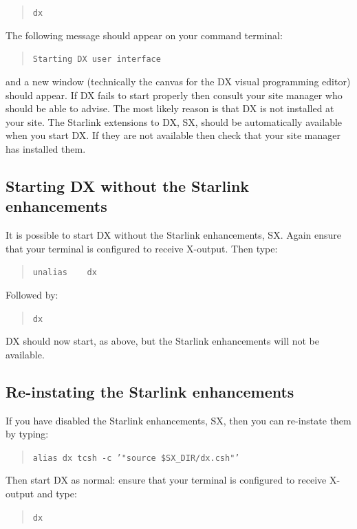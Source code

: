 \documentclass[twoside,11pt]{article}
\begin{document}
\begin{quote}
{\tt dx}
\end{quote}

The following message should appear on your command terminal:

\begin{quote}
{\tt Starting DX user interface}
\end{quote}

and a new window (technically the canvas for the DX visual programming
editor) should appear. If DX fails to start properly then consult your
site manager who should be able to advise. The most likely reason is
that DX is not installed at your site. The Starlink extensions to DX,
SX, should be automatically available when you start DX.  If they
are not available then check that your site manager has installed them.

\newpage
\subsection{Starting DX without the Starlink enhancements}

It is possible to start DX without the Starlink enhancements, SX. Again
ensure that your terminal is configured to receive X-output. Then
type:

\begin{quote}
{\tt unalias ~~ dx}
\end{quote}

Followed by:

\begin{quote}
{\tt dx}
\end{quote}

DX should now start, as above, but the Starlink enhancements will not
be available.

\subsection{Re-instating the Starlink enhancements}

If you have disabled the Starlink enhancements, SX, then you can
re-instate them by typing:

\begin{quote}
{\tt alias dx tcsh -c '"source \$SX\_DIR/dx.csh"'}
\end{quote}

Then start DX as normal: ensure that your terminal is configured to
receive X-output and type:

\begin{quote}
{\tt dx}
\end{quote}
\end{document}
